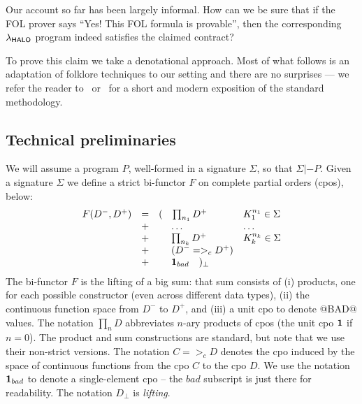 Our account so far has been largely informal.  How can we be sure
that if the FOL prover says ``Yes!  This FOL formula is provable'', then
the corresponding $\lambda_{\sf HALO}$ program indeed satisfies the claimed contract?

To prove this claim we take a denotational approach.
Most of what follows is an adaptation of folklore techniques to
our setting and there are no surprises --- we refer the reader
to~\cite{winskel} or~\cite{benton+:coq-domains} for a short and modern
exposition of the standard methodology.

\subsection{Technical preliminaries}

We will assume a program $P$, well-formed in a signature $\Sigma$, so
that $\Sigma |- P$.
Given a signature $\Sigma$ we define a strict
bi-functor $F$ on complete partial orders (cpos), below:
\[\begin{array}{lclll}
  F(D^{-},D^{+}) & = & ( \quad{\prod_{n_1}{D^{+}}} & K_1^{n_1} \in \Sigma \\
               & + & \;\quad\ldots                    & \ldots \\
               & + & \;\quad{\prod_{n_k}{D^{+}}} & K_k^{n_k} \in \Sigma \\
               & + & \;\quad(D^{-} =>_c D^{+}) \\
               & + & \;\quad{\sf{\bf 1}}_{bad} \quad )_{\bot}
\end{array}\]
The bi-functor $F$ is the lifting of a big sum: that sum consists of
(i) products, one for each possible constructor (even across different data types), (ii) the continuous
function space from $D^{-}$ to $D^{+}$, and (iii) a unit cpo to denote @BAD@ values.
The notation $\prod_{n}{D}$ abbreviates $n$-ary products of cpos (the unit cpo ${\sf{\bf 1}}$ if $n = 0$).
The product and sum constructions are standard, but note that we use their non-strict versions.
The notation $C =>_c D$ denotes the cpo
induced by the space of continuous functions from the cpo $C$ to the cpo $D$. We use
the notation ${\sf{\bf 1}}_{bad}$ to
denote a single-element cpo -- the $bad$ subscript is just there for readability.
The notation $D_\bot$ is {\em lifting}.

